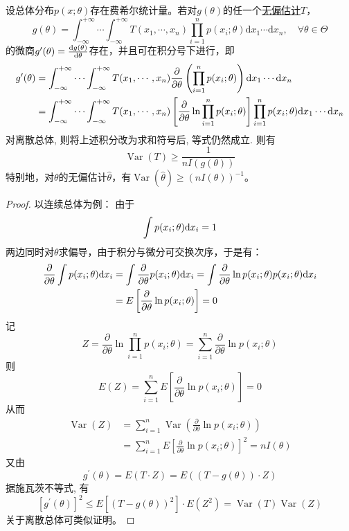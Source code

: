 \begin{theorem}\label{thm:Cramer-Rao_inequality}
    设总体分布$p(x;\theta)$存在费希尔统计量。若对$g(\theta)$的任一个\underline{无偏估计}$T$，
    \[ g(\theta)=\int_{-\infty}^{+\infty} \cdots \int_{-\infty}^{+\infty} T\left(x_{1}, \cdots, x_{n}\right) \prod_{i=1}^{n} p\left(x_{i} ; \theta\right) \mathrm{d} x_{1} \cdots \mathrm{d} x_{n} ,\quad \forall \theta \in \Theta\]
    的微商$g'(\theta)=\frac{\mathrm{d} g(\theta)}{\mathrm{d} \theta}$存在，并且可在积分号下进行，即
    \begin{align*}
        g^{\prime}(\theta) & =\int_{-\infty}^{+\infty} \cdots \int_{-\infty}^{+\infty} T(x_1, \cdots, x_n) \frac{\partial}{\partial \theta}\left(\prod_{i=1}^n p(x_i ; \theta)\right) \mathrm{d} x_1 \cdots \mathrm{d} x_n                                    \\
                           & =\int_{-\infty}^{+\infty} \cdots \int_{-\infty}^{+\infty} T(x_1, \cdots, x_n) \left[\frac{\partial}{\partial \theta} \ln \prod_{i=1}^n p(x_i ; \theta)\right] \prod_{i=1}^n p(x_i ; \theta) \mathrm{d} x_1 \cdots \mathrm{d} x_n
    \end{align*}
    对离散总体, 则将上述积分改为求和符号后, 等式仍然成立. 则有
    \[ \operatorname{Var}(T) \ge \frac1{n I(g(\theta))} \]
    特别地，对$\theta$的无偏估计$\hat{\theta}$，有$\operatorname{Var}(\hat{\theta})\ge (n I(\theta))^{-1}$。
\end{theorem}
\begin{proof}
    以连续总体为例：
    由于
    \[ \int p(x_i;\theta) \mathrm{d} x_i = 1 \]
    两边同时对$\theta$求偏导，由于积分与微分可交换次序，于是有：
    \begin{align*}
        \frac{\partial}{\partial \theta}\int p(x_i;\theta) \mathrm{d} x_i & = \int \frac{\partial}{\partial \theta}p(x_i;\theta) \mathrm{d} x_i = \int \frac{\partial}{\partial \theta}\ln p(x_i;\theta) p(x_i;\theta) \mathrm{d} x_i \\                                                                  & =E\left[\frac{\partial}{\partial \theta} \ln p(x_i ; \theta)\right]=0
    \end{align*}
    记
    \[ Z=\frac{\partial}{\partial \theta} \ln \prod_{i=1}^n p(x_i ; \theta)=\sum_{i=1}^n \frac{\partial}{\partial \theta} \ln p(x_i ; \theta) \]
    则
    \[ E(Z)=\sum_{i=1}^n E\left[\frac{\partial}{\partial \theta} \ln p(x_i ; \theta)\right]=0 \]
    从而
    \begin{align*}
        \operatorname{Var}(Z) & =\sum_{i=1}^{n} \operatorname{Var}\left(\frac{\partial}{\partial \theta} \ln p\left(x_{i} ; \theta\right)\right) \\
                              & =\sum_{i=1}^{n} E\left[\frac{\partial}{\partial \theta} \ln p\left(x_{i} ; \theta\right)\right]^{2}=n I(\theta)
    \end{align*}
    又由
    \[ g^{\prime}(\theta)=E(T \cdot Z)=E((T-g(\theta)) \cdot Z) \]
    据施瓦茨不等式, 有
    \[ \left[g^{\prime}(\theta)\right]^{2} \le  E\left[(T-g(\theta))^{2}\right] \cdot E\left(Z^{2}\right)=\operatorname{Var}(T) \operatorname{Var}(Z)\]
    关于离散总体可类似证明。
\end{proof}

